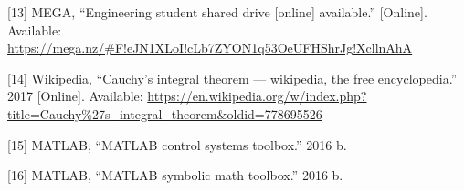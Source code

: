 \documentclass{scrreprt}
\theoremstyle{plain}
\theoremstyle{definition}
\theoremstyle{remark}
\begin{document}
\hypertarget{ref-megaElec360:Online}{}
{[}13{]} MEGA, ``Engineering student shared drive {[}online{]}
available.'' {[}Online{]}. Available:
\url{https://mega.nz/\#F!eJN1XLoI!cLb7ZYON1q53OeUFHShrJg!XcllnAhA}

\hypertarget{ref-wiki:Cauchy}{}
{[}14{]} Wikipedia, ``Cauchy's integral theorem --- wikipedia, the free
encyclopedia.'' 2017 {[}Online{]}. Available:
\url{https://en.wikipedia.org/w/index.php?title=Cauchy\%27s_integral_theorem\&oldid=778695526}

\hypertarget{ref-MatlabCST}{}
{[}15{]} MATLAB, ``MATLAB control systems toolbox.'' 2016 b.

\hypertarget{ref-MatlabSMT}{}
{[}16{]} MATLAB, ``MATLAB symbolic math toolbox.'' 2016 b.

\printglossaries

\end{document}
